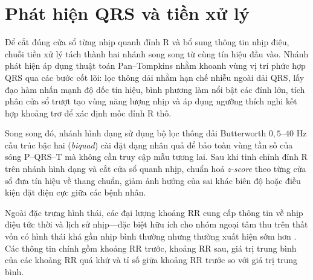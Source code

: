 \section{Phát hiện QRS và tiền xử lý}\label{sec:qrs}

Để cắt đúng cửa sổ từng nhịp quanh đỉnh R và bổ sung thông tin nhịp điệu, chuỗi tiền xử lý tách thành hai nhánh song song từ cùng tín hiệu đầu vào. Nhánh phát hiện áp dụng thuật toán Pan--Tompkins \cite{pantompkins1985realtime} nhằm khoanh vùng vị trí phức hợp QRS qua các bước cốt lõi: lọc thông dải nhằm hạn chế nhiễu ngoài dải QRS, lấy đạo hàm nhấn mạnh độ dốc tín hiệu, bình phương làm nổi bật các đỉnh lớn, tích phân cửa sổ trượt tạo vùng năng lượng nhịp và áp dụng ngưỡng thích nghi kết hợp khoảng trơ để xác định mốc đỉnh R thô.

Song song đó, nhánh hình dạng sử dụng bộ lọc thông dải Butterworth $0{,}5\text{--}40\text{ Hz}$ cấu trúc bậc hai (\emph{biquad}) cài đặt dạng nhân quả để bảo toàn vùng tần số của sóng P--QRS--T mà không cần truy cập mẫu tương lai. Sau khi tinh chỉnh đỉnh R trên nhánh hình dạng và cắt cửa sổ quanh nhịp, chuẩn hoá \emph{z-score} theo từng cửa sổ đưa tín hiệu về thang chuẩn, giảm ảnh hưởng của sai khác biên độ hoặc điều kiện đặt điện cực giữa các bệnh nhân.

Ngoài đặc trưng hình thái, các đại lượng khoảng RR cung cấp thông tin về nhịp điệu tức thời và lịch sử nhịp---đặc biệt hữu ích cho nhóm ngoại tâm thu trên thất vốn có hình thái khá gần nhịp bình thường nhưng thường xuất hiện sớm hơn \cite{dechazal2004automatic}. Các thông tin chính gồm khoảng RR trước, khoảng RR sau, giá trị trung bình của các khoảng RR quá khứ và tỉ số giữa khoảng RR trước so với giá trị trung bình.
